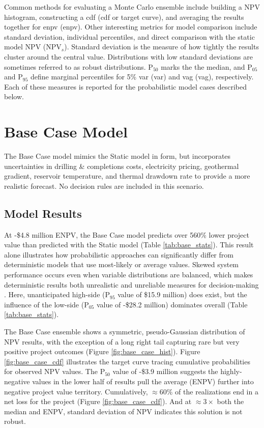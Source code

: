 Common methods for evaluating a Monte Carlo ensemble include building a NPV histogram, constructing a \acrlong{cdf} (\acrshort{cdf} or target curve), and averaging the results together for \acrlong{enpv} (\acrshort{enpv}). Other interesting metrics for model comparison include standard deviation, individual percentiles, and direct comparison with the static model NPV (NPV$_{s}$). Standard deviation is the measure of how tightly the results cluster around the central value. Distributions with low standard deviations are sometimes referred to as robust distributions. P$_{50}$ marks the the median, and P$_{05}$ and P$_{95}$ define marginal percentiles for 5\% \acrlong{var} (\acrshort{var}) and \acrlong{vag} (\acrshort{vag}), respectively. Each of these measures is reported for the probabilistic model cases described below.

\section{Base Case Model}
\label{ch6:base_case}

The Base Case model mimics the Static model in form, but incorporates uncertainties in drilling \& completions costs, electricity pricing, geothermal gradient, reservoir temperature, and thermal drawdown rate to provide a more realistic forecast. No decision rules are included in this scenario. 

\subsection{Model Results}
\label{ch6:base_results}

At -\$4.8 million ENPV, the Base Case model predicts over 560\% lower project value than predicted with the Static model (Table \ref{tab:base_stats}). This result alone illustrates how probabilistic approaches can significantly differ from deterministic models that use most-likely or average values. Skewed system performance occurs even when variable distributions are balanced, which makes deterministic results both unrealistic and unreliable measures for decision-making \citep[p.\ 48-49]{de_neufville_flexibility_2011}. Here, unanticipated high-side (P$_{95}$ value of \$15.9 million) does exist, but the influence of the low-side (P$_{05}$ value of -\$28.2 million) dominates overall (Table \ref{tab:base_stats}).

The Base Case ensemble shows a symmetric, pseudo-Gaussian distribution of NPV results, with the exception of a long right tail capturing rare but very positive project outcomes (Figure \ref{fig:base_case_hist}). Figure \ref{fig:base_case_cdf} illustrates the target curve tracing cumulative probabilities for observed NPV values. The P$_{50}$ value of -\$3.9 million suggests the highly-negative values in the lower half of results pull the average (ENPV) further into negative project value territory. Cumulatively, $\approx60\%$ of the realizations end in a net loss for the project (Figure \ref{fig:base_case_cdf}). And at $\approx 3\times$ both the median and ENPV, standard deviation of NPV indicates this solution is not robust. 

